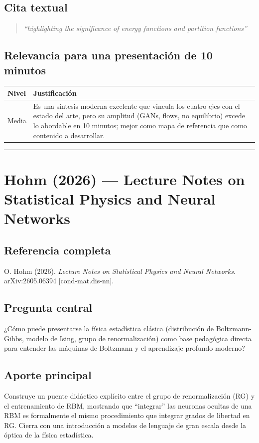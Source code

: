 \documentclass[12pt]{article}
\begin{document}
\subsection*{Cita textual}
\begin{quote}
\textit{``highlighting the significance of energy functions and partition functions''}
\end{quote}

\subsection*{Relevancia para una presentación de 10 minutos}
\begin{tabular}{@{}p{2cm}p{11.5cm}@{}}
\toprule
\textbf{Nivel} & \textbf{Justificación} \\
\midrule
Media & Es una síntesis moderna excelente que vincula los cuatro ejes con el estado del arte, pero su amplitud (GANs, flows, no equilibrio) excede lo abordable en 10 minutos; mejor como mapa de referencia que como contenido a desarrollar. \\
\bottomrule
\end{tabular}

\bigskip
\hrule
\bigskip

\section{Hohm (2026) --- Lecture Notes on Statistical Physics and Neural Networks}

\subsection*{Referencia completa}
O. Hohm (2026). \textit{Lecture Notes on Statistical Physics and Neural Networks}.
arXiv:2605.06394 [cond-mat.dis-nn]. \cite{hohm2026}

\subsection*{Pregunta central}
¿Cómo puede presentarse la física estadística clásica (distribución de Boltzmann-Gibbs, modelo
de Ising, grupo de renormalización) como base pedagógica directa para entender las máquinas de
Boltzmann y el aprendizaje profundo moderno?

\subsection*{Aporte principal}
Construye un puente didáctico explícito entre el grupo de renormalización (RG) y el
entrenamiento de RBM, mostrando que ``integrar'' las neuronas ocultas de una RBM es
formalmente el mismo procedimiento que integrar grados de libertad en RG. Cierra con una
introducción a modelos de lenguaje de gran escala desde la óptica de la física estadística.
\end{document}
